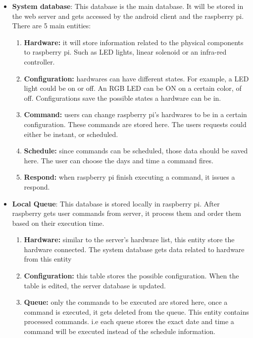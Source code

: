 \documentclass[12pt, oneside, a4paper]{book}
\newcommand\boldcolor[1]{\textcolor{bold}{\textbf{#1}}}
\begin{document}
				\begin{itemize}
					\item \boldcolor{System database}: This database is the main database. It will be stored in the web server and gets accessed by the android client and the raspberry pi. There are 5 main entities: 
					\begin{enumerate}
						\item \textbf{Hardware:} it will store information related to the physical components to raspberry pi. Such as LED lights, linear solenoid or an infra-red controller.  
						\item \textbf{Configuration:} hardwares can have different states. For example, a LED light could be on or off. An RGB LED can be ON on a certain color, of off. Configurations save the possible states a hardware can be in.
						\item \textbf{Command:} users can change raspberry pi's hardwares to be in a certain configuration. These commands are stored here. The users requests could either be instant, or scheduled. 
						\item \textbf{Schedule:} since commands can be scheduled, those data should be saved here. The user can choose the days and time a command fires.
						\item \textbf{Respond:} when raspberry pi finish executing a command, it issues a respond.
					\end{enumerate}
					\item \boldcolor{Local Queue}: This database is stored locally in raspberry pi. After raspberry gets user commands from server, it process them and order them based on their execution time.
					\begin{enumerate}
						\item \textbf{Hardware:} similar to the server's hardware list, this entity store the hardware connected. The system database gets data related to hardware from this entity 
						\item \textbf{Configuration:} this table stores the possible configuration. When the table is edited, the server database is updated.
						\item \textbf{Queue:} only the commands to be executed are stored here, once a command is executed, it gets deleted from the queue. This entity contains processed commands. i.e each queue stores the exact date and time a command will be executed instead of the schedule information.
					\end{enumerate}
				\end{itemize}
			
\end{document}
